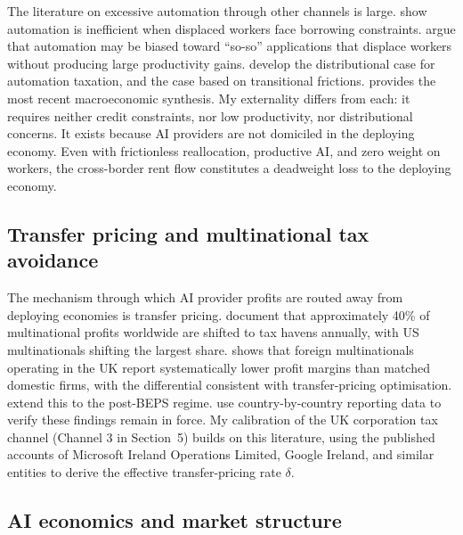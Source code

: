 \documentclass[11pt,letterpaper]{article}
\theoremstyle{remark}
\begin{document}
The literature on excessive automation through other channels is large. \citet{beraja_zorzi_2025} show automation is inefficient when displaced workers face borrowing constraints. \citet{acemoglu_restrepo_2020} argue that automation may be biased toward ``so-so'' applications that displace workers without producing large productivity gains. \citet{costinot_werning_2023} develop the distributional case for automation taxation, and \citet{guerreiro_rebelo_teles_2022} the case based on transitional frictions. \citet{acemoglu_2025} provides the most recent macroeconomic synthesis. My externality differs from each: it requires neither credit constraints, nor low productivity, nor distributional concerns. It exists because {AI} providers are not domiciled in the deploying economy. Even with frictionless reallocation, productive {AI}, and zero weight on workers, the cross-border rent flow constitutes a deadweight loss to the deploying economy.

\subsection{Transfer pricing and multinational tax avoidance}

The mechanism through which {AI} provider profits are routed away from deploying economies is transfer pricing. \citet{torslov_wier_zucman_2018, torslov_wier_zucman_2023} document that approximately 40\% of multinational profits worldwide are shifted to tax havens annually, with {US} multinationals shifting the largest share. \citet{bilicka_2019} shows that foreign multinationals operating in the {UK} report systematically lower profit margins than matched domestic firms, with the differential consistent with transfer-pricing optimisation. \citet{bilicka_devereux_guceri_2024} extend this to the post-{BEPS} regime. \citet{garcia_bernardo_2025} use country-by-country reporting data to verify these findings remain in force. My calibration of the {UK} corporation tax channel (Channel 3 in Section~5) builds on this literature, using the published accounts of Microsoft Ireland Operations Limited, Google Ireland, and similar entities to derive the effective transfer-pricing rate $\delta$.

\subsection{{AI} economics and market structure}
\end{document}
